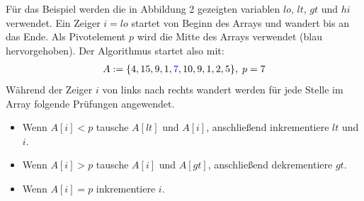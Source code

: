 \noindent
Für das Beispiel werden die in Abbildung 2 gezeigten variablen $lo$, $lt$, $gt$ und $hi$ verwendet. Ein Zeiger $i = lo$ startet von Beginn des Arrays und wandert bis an das Ende. Als Pivotelement $p$ wird die Mitte des Arrays verwendet (blau hervorgehoben). Der Algorithmus startet also mit:
\begin{gather*}
	A := \{4, 15, 9, 1, \textcolor{blue}{7}, 10, 9, 1, 2, 5\},\; p=7
\end{gather*}
\noindent
Während der Zeiger $i$ von links nach rechts wandert werden für jede Stelle im Array folgende Prüfungen angewendet.
\begin{itemize}
	\item Wenn $A[i] < p$ tausche $A[lt]$ und $A[i]$, anschließend inkrementiere $lt$ und $i$.
	\item Wenn $A[i] > p$ tausche $A[i]$ und $A[gt]$, anschließend dekrementiere $gt$.
	\item Wenn $A[i] = p$ inkrementiere $i$.
\end{itemize}